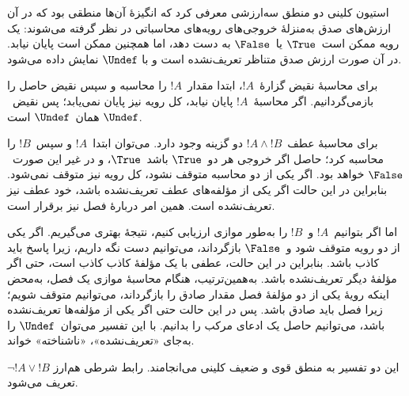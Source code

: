 \documentclass[../../../include/open-logic-section]{subfiles}
\begin{document}


استیون کلینی دو منطق سه‌ارزشی معرفی کرد که انگیزهٔ آن‌ها منطقی بود که
در آن ارزش‌های صدق به‌منزلهٔ خروجی‌های رویه‌های محاسباتی در نظر گرفته
می‌شوند: یک رویه ممکن است~$\True$ یا~$\False$ به دست دهد، اما همچنین
ممکن است پایان نیابد. در آن صورت ارزش صدق متناظر تعریف‌نشده است و با
$\Undef$ نمایش داده می‌شود.

برای محاسبهٔ نقیض گزارهٔ~$!A$، ابتدا مقدار~$!A$ را محاسبه و سپس نقیض
حاصل را بازمی‌گردانیم. اگر محاسبهٔ~$!A$ پایان نیابد، کل رویه نیز پایان
نمی‌یابد؛ پس نقیض~$\Undef$ همان~$\Undef$ است.

برای محاسبهٔ عطف~$!A \land !B$ دو گزینه وجود دارد. می‌توان ابتدا~$!A$
و سپس~$!B$ را محاسبه کرد؛ حاصل اگر خروجی هر دو~$\True$ باشد~$\True$، و
در غیر این صورت~$\False$ خواهد بود. اگر یکی از دو محاسبه متوقف نشود،
کل رویه نیز متوقف نمی‌شود. بنابراین در این حالت اگر یکی از مؤلفه‌های
عطف تعریف‌نشده باشد، خود عطف نیز تعریف‌نشده است. همین امر دربارهٔ فصل
نیز برقرار است.

اما اگر بتوانیم~$!A$ و~$!B$ را به‌طور موازی ارزیابی کنیم، نتیجهٔ بهتری
می‌گیریم. اگر یکی از دو رویه متوقف شود و~$\False$ بازگرداند، می‌توانیم
دست نگه داریم، زیرا پاسخ باید کاذب باشد. بنابراین در این حالت، عطفی با
یک مؤلفهٔ کاذب کاذب است، حتی اگر مؤلفهٔ دیگر تعریف‌نشده باشد.
به‌همین‌ترتیب، هنگام محاسبهٔ موازی یک فصل، به‌محض اینکه رویهٔ یکی از دو
مؤلفهٔ فصل مقدار صادق را بازگرداند، می‌توانیم متوقف شویم؛ زیرا فصل باید
صادق باشد. پس در این حالت حتی اگر یکی از مؤلفه‌ها تعریف‌نشده باشد،
می‌توانیم حاصل یک ادعای مرکب را بدانیم. با این تفسیر می‌توان~$\Undef$
را به‌جای «تعریف‌نشده»، «ناشناخته» خواند.

این دو تفسیر به منطق قوی و ضعیف کلینی می‌انجامند. رابط شرطی هم‌ارز
$\lnot !A \lor !B$ تعریف می‌شود.
\end{document}
